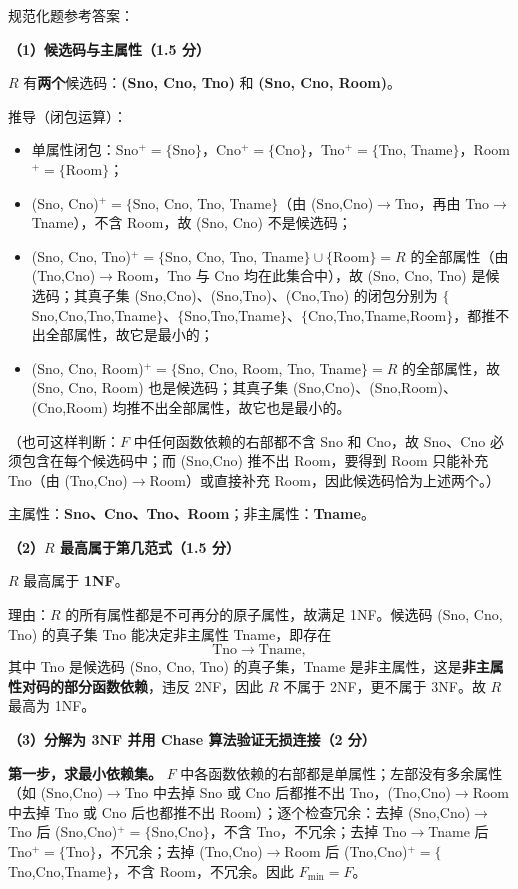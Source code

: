 \documentclass[a4paper,11pt]{article}
\begin{document}
\q 规范化题参考答案：

\textbf{（1）候选码与主属性（1.5 分）}

$R$ 有\textbf{两个}候选码：\textbf{(Sno, Cno, Tno)} 和 \textbf{(Sno, Cno, Room)}。

推导（闭包运算）：
\begin{itemize}[leftmargin=1.6em, itemsep=1pt]
  \item 单属性闭包：Sno$^{+}=\{$Sno$\}$，Cno$^{+}=\{$Cno$\}$，Tno$^{+}=\{$Tno, Tname$\}$，Room$^{+}=\{$Room$\}$；
  \item (Sno, Cno)$^{+}=\{$Sno, Cno, Tno, Tname$\}$（由 (Sno,Cno)$\to$Tno，再由 Tno$\to$Tname），不含 Room，故 (Sno, Cno) 不是候选码；
  \item (Sno, Cno, Tno)$^{+}=\{$Sno, Cno, Tno, Tname$\}\cup\{$Room$\}=R$ 的全部属性（由 (Tno,Cno)$\to$Room，Tno 与 Cno 均在此集合中），故 (Sno, Cno, Tno) 是候选码；其真子集 (Sno,Cno)、(Sno,Tno)、(Cno,Tno) 的闭包分别为 $\{$Sno,Cno,Tno,Tname$\}$、$\{$Sno,Tno,Tname$\}$、$\{$Cno,Tno,Tname,Room$\}$，都推不出全部属性，故它是最小的；
  \item (Sno, Cno, Room)$^{+}=\{$Sno, Cno, Room, Tno, Tname$\}=R$ 的全部属性，故 (Sno, Cno, Room) 也是候选码；其真子集 (Sno,Cno)、(Sno,Room)、(Cno,Room) 均推不出全部属性，故它也是最小的。
\end{itemize}
（也可这样判断：$F$ 中任何函数依赖的右部都不含 Sno 和 Cno，故 Sno、Cno 必须包含在每个候选码中；而 (Sno,Cno) 推不出 Room，要得到 Room 只能补充 Tno（由 (Tno,Cno)$\to$Room）或直接补充 Room，因此候选码恰为上述两个。）

主属性：\textbf{Sno、Cno、Tno、Room}；非主属性：\textbf{Tname}。

\textbf{（2）$R$ 最高属于第几范式（1.5 分）}

$R$ 最高属于 \textbf{1NF}。

理由：$R$ 的所有属性都是不可再分的原子属性，故满足 1NF。候选码 (Sno, Cno, Tno) 的真子集 Tno 能决定非主属性 Tname，即存在
\[
\text{Tno}\to\text{Tname},
\]
其中 Tno 是候选码 (Sno, Cno, Tno) 的真子集，Tname 是非主属性，这是\textbf{非主属性对码的部分函数依赖}，违反 2NF，因此 $R$ 不属于 2NF，更不属于 3NF。故 $R$ 最高为 1NF。

\textbf{（3）分解为 3NF 并用 Chase 算法验证无损连接（2 分）}

\textbf{第一步，求最小依赖集。} $F$ 中各函数依赖的右部都是单属性；左部没有多余属性（如 (Sno,Cno)$\to$Tno 中去掉 Sno 或 Cno 后都推不出 Tno，(Tno,Cno)$\to$Room 中去掉 Tno 或 Cno 后也都推不出 Room）；逐个检查冗余：去掉 (Sno,Cno)$\to$Tno 后 (Sno,Cno)$^{+}=\{$Sno,Cno$\}$，不含 Tno，不冗余；去掉 Tno$\to$Tname 后 Tno$^{+}=\{$Tno$\}$，不冗余；去掉 (Tno,Cno)$\to$Room 后 (Tno,Cno)$^{+}=\{$Tno,Cno,Tname$\}$，不含 Room，不冗余。因此 $F_{\min}=F$。
\end{document}
